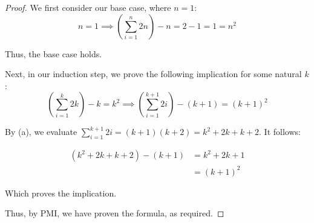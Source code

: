 \documentclass[12pt, a4paper]{article}
\begin{document}
\begin{proof}
    We first consider our base case, where $n = 1$:
    \[
        n = 1 \implies \left(\sum_{i = 1}^{n} 2n\right) - n = 2 - 1 = 1 = n^2
    \]

    Thus, the base case holds.

    Next, in our induction step, we prove the following implication for some natural $k$:
    \[
        \left(\sum_{i = 1}^{k} 2k\right) - k = k^2 
        \implies \left(\sum_{i = 1}^{k + 1} 2i\right) - (k + 1) = (k + 1)^2
    \]

    By (a), we evaluate $\displaystyle\sum_{i = 1}^{k + 1} 2i = (k + 1)(k + 2) = k^2 + 2k + k + 2$.
    It follows:
    
    \begin{align*}
        (k^2 + 2k + k + 2) - (k + 1) & = k^2 + 2k + 1\\
        & = (k + 1)^2
    \end{align*}

    Which proves the implication.

    Thus, by PMI, we have proven the formula, as required.
\end{proof}
\end{document}
